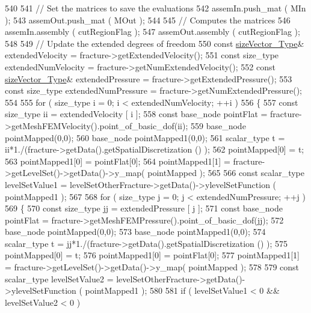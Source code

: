 \begin{DoxyCode}
540 
541     \textcolor{comment}{// Set the matrices to save the evaluations}
542     assemIn.push\_mat ( MIn );
543     assemOut.push\_mat ( MOut );
544 
545     \textcolor{comment}{// Computes the matrices}
546     assemIn.assembly ( cutRegionFlag );
547     assemOut.assembly ( cutRegionFlag );
548 
549     \textcolor{comment}{// Update the extended degrees of freedom}
550     \textcolor{keyword}{const} \hyperlink{Core_8h_a83c51913d041a5001e8683434c09857f}{sizeVector\_Type}& extendedVelocity = fracture->getExtendedVelocity();
551     \textcolor{keyword}{const} size\_type extendedNumVelocity = fracture->getNumExtendedVelocity();
552     \textcolor{keyword}{const} \hyperlink{Core_8h_a83c51913d041a5001e8683434c09857f}{sizeVector\_Type}& extendedPressure = fracture->getExtendedPressure();
553     \textcolor{keyword}{const} size\_type extendedNumPressure = fracture->getNumExtendedPressure();
554 
555     \textcolor{keywordflow}{for} ( size\_type i = 0; i < extendedNumVelocity; ++i )
556     \{
557         \textcolor{keyword}{const} size\_type ii = extendedVelocity [ i ];
558         \textcolor{keyword}{const} base\_node pointFlat = fracture->getMeshFEMVelocity().point\_of\_basic\_dof(ii);
559         base\_node pointMapped(0,0);
560         base\_node pointMapped1(0,0);
561     scalar\_type t = ii*1./(fracture->getData().getSpatialDiscretization () );
562         pointMapped[0] = t;
563         pointMapped1[0] = pointFlat[0];
564         pointMapped1[1] = fracture->getLevelSet()->getData()->y\_map( pointMapped );
565 
566         \textcolor{keyword}{const} scalar\_type levelSetValue1 = levelSetOtherFracture->getData()->ylevelSetFunction ( 
      pointMapped1 );
567 
568         \textcolor{keywordflow}{for} ( size\_type j = 0; j < extendedNumPressure; ++j )
569         \{
570             \textcolor{keyword}{const} size\_type jj = extendedPressure [ j ];
571             \textcolor{keyword}{const} base\_node pointFlat = fracture->getMeshFEMPressure().point\_of\_basic\_dof(jj);
572             base\_node pointMapped(0,0);
573             base\_node pointMapped1(0,0);
574             scalar\_type t = jj*1./(fracture->getData().getSpatialDiscretization () );
575             pointMapped[0] = t;
576             pointMapped1[0] = pointFlat[0];
577             pointMapped1[1] = fracture->getLevelSet()->getData()->y\_map( pointMapped );
578            
579         \textcolor{keyword}{const} scalar\_type levelSetValue2 = levelSetOtherFracture->getData()->ylevelSetFunction ( 
      pointMapped1 );
580 
581             \textcolor{keywordflow}{if} ( levelSetValue1 < 0 && levelSetValue2 < 0 )

\end{DoxyCode}
